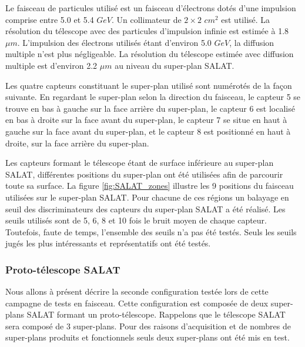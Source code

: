   Le faisceau de particules utilis\'e est un faisceau d'\'electrons dot\'es d'une impulsion comprise entre 5.0 et 5.4 $GeV$. Un collimateur de $2 \times 2$ $cm^2$ est utilis\'e. La r\'esolution du t\'elescope avec des particules d'impulsion infinie est estim\'ee \`a 1.8 $\mu m$. L'impulsion des \'electrons utilis\'es \'etant d'environ 5.0 $GeV$, la diffusion multiple n'est plus n\'egligeable. La r\'esolution du t\'elescope estim\'ee avec diffusion multiple est d'environ 2.2 $\mu m$ au niveau du super-plan SALAT.
  
  \medskip
  
  Les quatre capteurs constituant le super-plan utilis\'e sont num\'erot\'es de la façon suivante. En regardant le super-plan selon la direction du faisceau, le capteur 5 se trouve en bas \`a gauche sur la face arri\`ere du super-plan, le capteur 6 est localis\'e en bas \`a droite sur la face avant du super-plan, le capteur 7 se situe en haut \`a gauche sur la face avant du super-plan, et le capteur 8 est positionn\'e en haut \`a droite, sur la face arri\`ere du super-plan.
  
  \medskip
  
  Les capteurs formant le t\'elescope \'etant de surface inf\'erieure au super-plan SALAT, diff\'erentes positions du super-plan ont \'et\'e utilis\'ees afin de parcourir toute sa surface. La figure \ref{fig:SALAT_zones} illustre les 9 positions du faisceau utilis\'ees sur le super-plan SALAT. Pour chacune de ces r\'egions un balayage en seuil des discriminateurs des capteurs du super-plan SALAT a \'et\'e r\'ealis\'e. Les seuils utilis\'es sont de 5, 6, 8 et 10 fois le bruit moyen de chaque capteur. Toutefois, faute de temps, l'ensemble des seuils n'a pas \'et\'e test\'es. Seuls les seuils jug\'es les plus int\'eressants et repr\'esentatifs ont \'et\'e test\'es.
  
  \subsubsection{Proto-t\'elescope SALAT}
  
  Nous allons \`a pr\'esent d\'ecrire la seconde configuration test\'ee lors de cette campagne de tests en faisceau. Cette configuration est compos\'ee de deux super-plans SALAT formant un proto-t\'elescope. Rappelons que le t\'elescope SALAT sera compos\'e de 3 super-plans. Pour des raisons d'acquisition et de nombres de super-plans produits et fonctionnels seuls deux super-plans ont \'et\'e mis en test.

